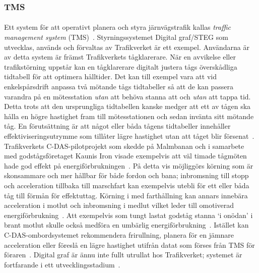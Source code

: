 \subsubsection{TMS}
\paragraph{}
\hspace{-11pt}Ett system för att operativt planera och styra järnvägstrafik kallas \emph{traffic management system} (TMS)~\cite{Joborn2023}.
Styrningssystemet Digital graf/STEG som utvecklas, används och förvaltas av Trafikverket är ett exempel.
Användarna är av detta system är främst Trafikverkets tågklarerare.
När en avvikelse eller trafikstörning uppstår kan en tågklarerare digitalt justera tågs överskådliga tidtabell för att optimera hålltider.
Det kan till exempel vara att vid enkelspårsdrift anpassa två mötande tågs tidtabeller så att de kan passera varandra på en mötesstation \emph{utan} att behöva stanna att och \emph{utan} att tappa tid.
Detta trots att den ursprungliga tidtabellen kanske medger att ett av tågen ska hålla en högre hastighet fram till mötesstationen och sedan invänta sitt mötande tåg.
En förutsättning är att något eller båda tågens tidtabeller innehåller effektiviseringsutrymme som tillåter lägre hastighet utan att tåget blir försenat~\cite{Joborn2023}.
Trafikverkets C-DAS-pilotprojekt som skedde på Malmbanan och i samarbete med godstågsföretaget Kaunis Iron visade exempelvis att väl timade tågmöten hade god effekt på energiförbrukningen~\cite{Lindmark2022}.
På detta vis möjliggörs körning som är skonsammare och mer hållbar för både fordon och bana; inbromsning till stopp och acceleration tillbaka till marschfart kan exempelvis utebli för ett eller båda tåg till förmån för effektuttag.
Körning i med farthållning kan annars innebära acceleration i motlut och inbromsning i medlut vilket leder till omotiverad energiförbrukning~\cite{Lindmark2022}.
Att exempelvis som tungt lastat godståg stanna \lq{}i onödan\rq{} i brant motlut skulle också medföra en umbärlig energiförbrukning~\cite{Lindmark2022}.
Istället kan C-DAS-ombordsystemet rekommendera frirullning, planera för en jämnare acceleration eller föreslå en lägre hastighet utifrån datat som förses från TMS för föraren~\cite{Lindmark2022}.
Digital graf är ännu inte fullt utrullat hos Trafikverket; systemet är fortfarande i ett utvecklingsstadium~\cite{Joborn2023}.
